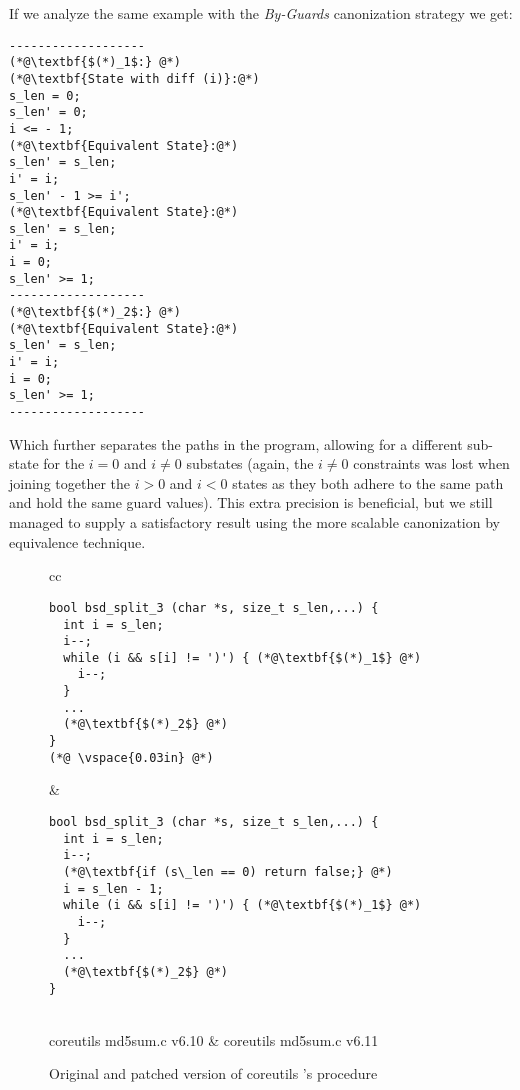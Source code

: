 If we analyze the same example with the \emph{By-Guards} canonization strategy we get:
\begin{lstlisting}
-------------------
(*@\textbf{$(*)_1$:} @*)
(*@\textbf{State with diff (i)}:@*)
s_len = 0;
s_len' = 0;
i <= - 1;
(*@\textbf{Equivalent State}:@*)
s_len' = s_len;
i' = i;
s_len' - 1 >= i';
(*@\textbf{Equivalent State}:@*)
s_len' = s_len;
i' = i;
i = 0;
s_len' >= 1;
-------------------
(*@\textbf{$(*)_2$:} @*)
(*@\textbf{Equivalent State}:@*)
s_len' = s_len;
i' = i;
i = 0;
s_len' >= 1;
-------------------
\end{lstlisting}
Which further separates the paths in the program, allowing for a different sub-state for the $i = 0$ and $i \neq 0$ substates (again, the $i \neq 0$ constraints was lost when joining together the $i > 0$ and $i < 0$ states as they both adhere to the same path and hold the same guard values). This extra precision is beneficial, but we still managed to supply a satisfactory result using the more scalable canonization by equivalence technique.

\begin{figure*}
\centering
\begin{tabular}{cc}
\begin{lstlisting}
bool bsd_split_3 (char *s, size_t s_len,...) {
  int i = s_len;
  i--;
  while (i && s[i] != ')') { (*@\textbf{$(*)_1$} @*)
    i--;
  }
  ...
  (*@\textbf{$(*)_2$} @*)
}
(*@ \vspace{0.03in} @*)
\end{lstlisting}
&
\begin{lstlisting}
bool bsd_split_3 (char *s, size_t s_len,...) {
  int i = s_len;
  i--;
  (*@\textbf{if (s\_len == 0) return false;} @*)
  i = s_len - 1;
  while (i && s[i] != ')') { (*@\textbf{$(*)_1$} @*)
    i--;
  }
  ...
  (*@\textbf{$(*)_2$} @*)
}
\end{lstlisting}
\\
coreutils md5sum.c v6.10 & coreutils md5sum.c v6.11
\end{tabular}
\caption{Original and patched version of coreutils 's  procedure}
\end{figure*}

